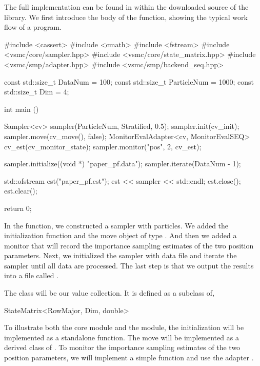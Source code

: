 \documentclass[11pt, fontset=Minion, showoverfull,
bib, mintcode, minted=cache]{marticle}
\begin{document}
The full implementation can be found in
 within the downloaded source of
the library. We first introduce the body of the  function,
showing the typical work flow of a \vsmc program.
\begin{cppcode}
#include <cassert>
#include <cmath>
#include <fstream>
#include <vsmc/core/sampler.hpp>
#include <vsmc/core/state_matrix.hpp>
#include <vsmc/smp/adapter.hpp>
#include <vsmc/smp/backend_seq.hpp>

const std::size_t DataNum = 100;
const std::size_t ParticleNum = 1000;
const std::size_t Dim = 4;

int main ()
{
    Sampler<cv> sampler(ParticleNum, Stratified, 0.5);
    sampler.init(cv_init);
    sampler.move(cv_move(), false);
    MonitorEvalAdapter<cv, MonitorEvalSEQ> cv_est(cv_monitor_state);
    sampler.monitor("pos", 2, cv_est);

    sampler.initialize((void *) "paper_pf.data");
    sampler.iterate(DataNum - 1);

    std::ofstream est("paper_pf.est");
    est << sampler << std::endl;
    est.close();
    est.clear();

    return 0;
}
\end{cppcode}
In the  function, we constructed a sampler with
 particles. We added the initialization function
 and the move object of type . And then
we added a monitor that will record the importance sampling estimates of the
two position parameters. Next, we initialized the sampler with data file
 and iterate the sampler until all data are
processed. The last step is that we output the results into a file called
.

The class  will be our value collection. It is defined as a
subclass of,
\begin{cppcode}
StateMatrix<RowMajor, Dim, double>
\end{cppcode}
To illustrate both the core module and the \smp module, the initialization
 will be implemented as a standalone function. The move
 will be implemented as a derived class of
. To monitor the importance sampling estimates of the
two position parameters, we will implement a simple function
 and use the adapter
.
\end{document}

